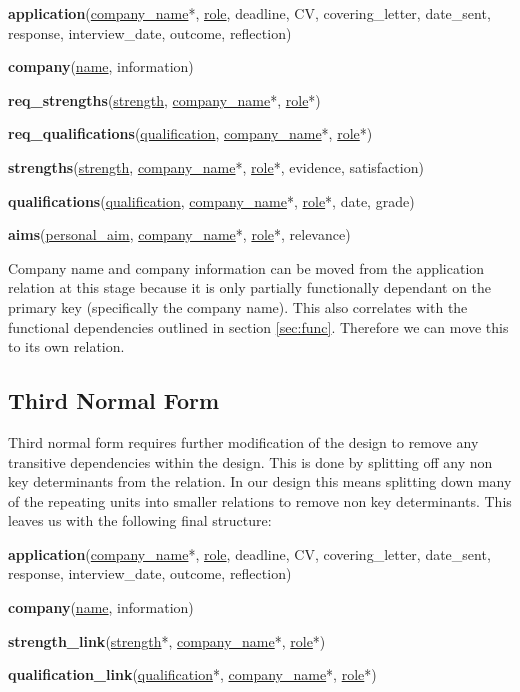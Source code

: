 \documentclass{article}
\begin{document}
\textbf{application}(\underline{company\_name}*, \underline{role}, deadline, CV, covering\_letter, date\_sent, response, interview\_date, outcome, reflection)

\textbf{company}(\underline{name}, information)

\textbf{req\_strengths}(\underline{strength}, \underline{company\_name}*, \underline{role}*)

\textbf{req\_qualifications}(\underline{qualification}, \underline{company\_name}*, \underline{role}*)

\textbf{strengths}(\underline{strength}, \underline{company\_name}*, \underline{role}*, evidence, satisfaction)

\textbf{qualifications}(\underline{qualification}, \underline{company\_name}*, \underline{role}*, date, grade)

\textbf{aims}(\underline{personal\_aim}, \underline{company\_name}*, \underline{role}*, relevance)

Company name and company information can be moved from the application relation at this stage because it is only partially functionally dependant on the primary key (specifically the company name). This also correlates with the functional dependencies outlined in section \ref{sec:func}. Therefore we can move this to its own relation.  

\subsection{Third Normal Form}

Third normal form requires further modification of the design to remove any transitive dependencies within the design. This is done by splitting off any non key determinants from the relation. In our design this means splitting down many of the repeating units into smaller relations to remove non key determinants. This leaves us with the following final structure:

\textbf{application}(\underline{company\_name}*, \underline{role}, deadline, CV, covering\_letter, date\_sent, response, interview\_date, outcome, reflection)

\textbf{company}(\underline{name}, information)

\textbf{strength\_link}(\underline{strength}*, \underline{company\_name}*, \underline{role}*)

\textbf{qualification\_link}(\underline{qualification}*, \underline{company\_name}*, \underline{role}*)
\end{document}
